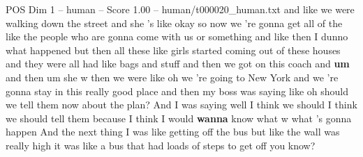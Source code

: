 \begin{textsample}{POS Dim 1 – human – Score 1.00 – human/t000020\_human.txt}  \label{ex:f1_pos_007}
and like we were walking down the street and she 's like okay so now we 're gonna get all of the like the people who are gonna come with us or something and like then I dunno what happened but then all these like girls started coming out of these houses and they were all had like bags and stuff and then we got on this coach and \textbf{um} and then um she w then we were like oh we 're going to New York and we 're gonna stay in this really good place and then my boss was saying like oh should we tell them now about the plan?
And I was saying well I think we should I think we should tell them because I think I would \textbf{wanna} know what w what 's gonna happen And the next thing I was like getting off the bus but like the wall was really high it was like a bus that had loads of steps to get off you know?

\end{textsample}
